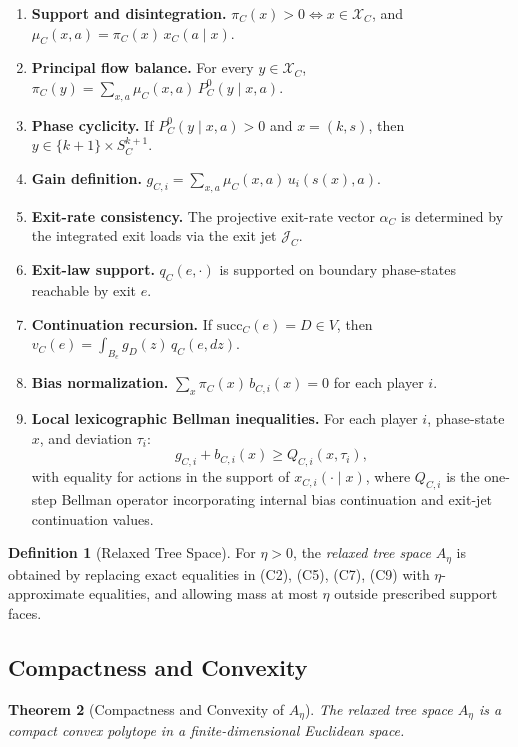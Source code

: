 \documentclass[12pt,a4paper]{article}
\newtheorem{theorem}{Theorem}[section]
\theoremstyle{definition}
\newtheorem{definition}[theorem]{Definition}
\newcommand{\cX}{\mathcal{X}}
\newcommand{\cJ}{\mathcal{J}}
\begin{document}
\begin{enumerate}[label=(C\arabic*)]
\item \textbf{Support and disintegration.} $\pi_C(x) > 0 \Leftrightarrow x \in \cX_C$, and $\mu_C(x,a) = \pi_C(x) \, x_C(a \mid x)$.
\item \textbf{Principal flow balance.} For every $y \in \cX_C$, $\pi_C(y) = \sum_{x,a} \mu_C(x,a) \, P_C^0(y \mid x, a)$.
\item \textbf{Phase cyclicity.} If $P_C^0(y \mid x, a) > 0$ and $x = (k, s)$, then $y \in \{k+1\} \times S_C^{k+1}$.
\item \textbf{Gain definition.} $g_{C,i} = \sum_{x,a} \mu_C(x,a) \, u_i(s(x), a)$.
\item \textbf{Exit-rate consistency.} The projective exit-rate vector $\alpha_C$ is determined by the integrated exit loads via the exit jet $\cJ_C$.
\item \textbf{Exit-law support.} $q_C(e, \cdot)$ is supported on boundary phase-states reachable by exit $e$.
\item \textbf{Continuation recursion.} If $\mathrm{succ}_C(e) = D \in V$, then $v_C(e) = \int_{B_e} g_D(z) \, q_C(e, dz)$.
\item \textbf{Bias normalization.} $\sum_x \pi_C(x) \, b_{C,i}(x) = 0$ for each player $i$.
\item \textbf{Local lexicographic Bellman inequalities.} For each player $i$, phase-state $x$, and deviation $\tau_i$:
\[
g_{C,i} + b_{C,i}(x) \geq Q_{C,i}(x, \tau_i),
\]
with equality for actions in the support of $x_{C,i}(\cdot \mid x)$, where $Q_{C,i}$ is the one-step Bellman operator incorporating internal bias continuation and exit-jet continuation values.
\end{enumerate}

\begin{definition}[Relaxed Tree Space]
\label{def:relaxed}
For $\eta > 0$, the \emph{relaxed tree space} $A_\eta$ is obtained by replacing exact equalities in (C2), (C5), (C7), (C9) with $\eta$-approximate equalities, and allowing mass at most $\eta$ outside prescribed support faces.
\end{definition}

\subsection{Compactness and Convexity}
\label{sec:compactness}

\begin{theorem}[Compactness and Convexity of $A_\eta$]
\label{thm:compact-convex}
The relaxed tree space $A_\eta$ is a compact convex polytope in a finite-dimensional Euclidean space.
\end{theorem}
\end{document}
